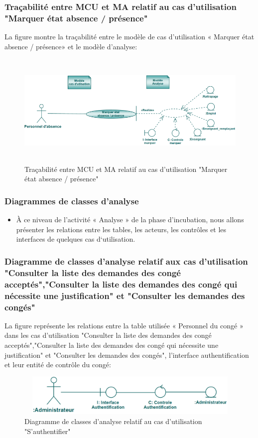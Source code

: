 \documentclass[12 pt]{report}
\begin{document}
\subsubsection{Traçabilité entre MCU et MA relatif au  cas d’utilisation "Marquer état absence / présence" }
La figure  montre la traçabilité entre le modèle de  cas d’utilisation « Marquer état absence / présence» et le modèle d’analyse:
\begin{figure}[h]
\begin{center}
\includegraphics[width= 12cm , height =5.5cm]{tra_mar_abs.PNG}
\caption{Traçabilité entre MCU et MA relatif au  cas d’utilisation "Marquer état absence / présence"}
\end{center}
\end{figure}
\subsubsection{Diagrammes de classes d'analyse}
\begin{itemize}[font=\color{black} \Large, label=] 
\item À ce niveau de l’activité « Analyse » de la phase d’incubation, nous allons présenter les relations entre les tables, les acteurs, les contrôles et les interfaces de quelques cas d‘utilisation.
\end{itemize}
\subsubsection{Diagramme de classes d’analyse relatif aux cas d’utilisation "Consulter la liste des demandes des congé acceptés","Consulter la liste des demandes des congé qui nécessite une justification" et "Consulter les demandes des congés" }
La figure  représente les relations entre la table utilisée « Personnel du congé » dans les cas d’utilisation  "Consulter la liste des demandes des congé acceptés","Consulter la liste des demandes des congé qui nécessite une justification" et "Consulter les demandes des congés", l’interface  authentification et  leur entité de  contrôle du congé:
\begin{figure}[h]
\begin{center}
\includegraphics[width= 12cm , height =2cm]{classid.png}
\caption{Diagramme de classes d’analyse relatif au cas d’utilisation "S’authentifier"}
\end{center}
\end{figure}
\end{document}
